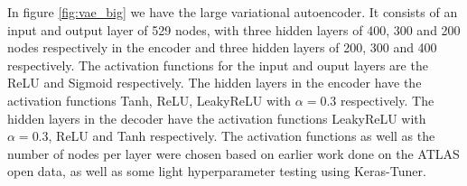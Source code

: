 In figure \ref{fig:vae_big} we have the large variational autoencoder. It consists of an input and output layer of 529 nodes, with three 
hidden layers of 400, 300 and 200 nodes respectively in the encoder and three hidden layers of 200, 300 and 400 respectively. 
The activation functions for the input and ouput layers are the ReLU and Sigmoid respectively. The hidden 
layers in the encoder have the activation functions Tanh, ReLU, LeakyReLU with $\alpha=0.3$ respectively. The hidden layers
in the decoder have the activation functions LeakyReLU with $\alpha=0.3$, ReLU and Tanh respectively. The activation functions 
as well as the number of nodes per layer were chosen based on earlier work done 
on the ATLAS open data\cite{fys5555}, as well as some light hyperparameter testing using Keras-Tuner\cite{omalley2019kerastuner}.